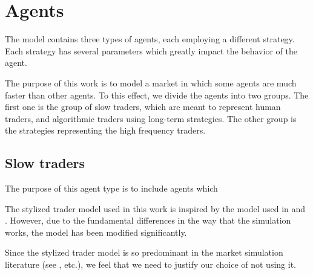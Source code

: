 \section{Agents}\label{section:agents}
The model contains three types of agents, each employing a different strategy. Each strategy has several parameters which greatly impact the behavior of the agent.

The purpose of this work is to model a market in which some agents are much faster than other agents. To this effect, we divide the agents into two groups. The first one is the group of slow traders, which are meant to represent human traders, and algorithmic traders using long-term strategies. The other group is the strategies representing the high frequency traders. 

\cite{Reference1}



\subsection{Slow traders}\label{section:slow_traders}


The purpose of this agent type is to include agents which 

The stylized trader model used in this work is inspired by the model used in \cite{chiWang} and \cite{theImpactOfHeterogenous}. However, due to the fundamental differences in the way that the simulation works, the model has been modified significantly. 

Since the stylized trader model is so predominant in the market simulation literature (see \cite{asd}, \cite{asd} etc.), we feel that we need to justify our choice of not using it. 

